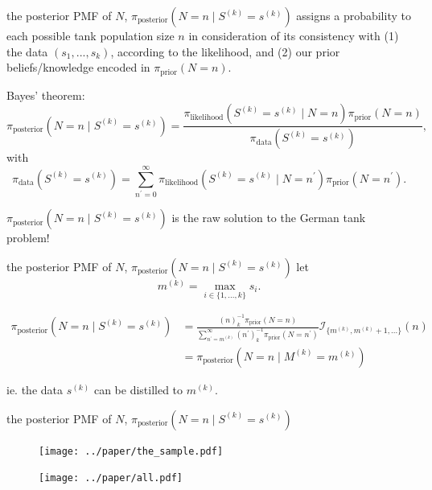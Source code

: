 \documentclass[10pt]{beamer}
\newcommand{\data}{$(s_1, ..., s_k)$\xspace}
\begin{document}
\begin{frame}[t]{the posterior PMF of $N$, $\pi_{\text{posterior}}(N=n \mid S^{(k)}=s^{(k)})$}
 assigns a probability to each possible tank population size $n$ in consideration of its consistency with (1) the data \data, according to the likelihood, and (2) our prior beliefs/knowledge encoded in $\pi_{\text{prior}}(N=n)$. 

\pause 

\alert{Bayes' theorem}:
\begin{equation*}
	\pi_{\text{posterior}}(N=n \mid S^{(k)}=s^{(k)}) = 
	\frac{\pi_{\text{likelihood}}(S^{(k)}=s^{(k)} \mid N=n) \pi_{\text{prior}}(N=n)}{\pi_{\text{data}}(S^{(k)}=s^{(k)})},
\end{equation*} with
\begin{equation*}
	\pi_{\text{data}}(S^{(k)}=s^{(k)})= \displaystyle \sum_{n^\prime=0}^\infty \pi_{\text{likelihood}}(S^{(k)}=s^{(k)} \mid N=n^\prime) \pi_{\text{prior}}(N=n^\prime). \label{eq:prob_data}
\end{equation*}

\pause 
$\pi_{\text{posterior}}(N=n \mid S^{(k)}=s^{(k)})$ is the raw solution to the German tank problem!
\end{frame}

\begin{frame}[t]{the posterior PMF of $N$, $\pi_{\text{posterior}}(N=n \mid S^{(k)}=s^{(k)})$}
let 
\begin{equation*}
    m^{(k)} = \max_{i \in \{1, ..., k\}} s_i .
\end{equation*} 

\pause 
\begin{align*}
	\pi_{\text{posterior}}(N=n \mid S^{(k)}=s^{(k)}) 
	& =\frac{
		\displaystyle (n)_k^{-1} \pi_{\text{prior}}(N=n)
	}{
		\displaystyle \sum_{n^\prime=m^{(k)}}^\infty (n^\prime)_{k}^{-1}  \pi_{\text{prior}}(N=n^\prime)
	}
	\mathcal{I}_{\{m^{(k)}, m^{(k)}+1,...\}}(n) \\
	&= \pi_{\text{posterior}}(N=n \mid M^{(k)}=m^{(k)})
	\label{eq:post_simple}
\end{align*}

ie. the data $s^{(k)}$ can be distilled to $m^{(k)}$.
\end{frame}


\begin{frame}[t]{the posterior PMF of $N$, $\pi_{\text{posterior}}(N=n \mid S^{(k)}=s^{(k)})$}
\begin{figure}[h!]
	\centering
	\texttt{[image: ../paper/the\_sample.pdf]}
	
	\texttt{[image: ../paper/all.pdf]}	
\end{figure}
\end{frame}
\end{document}
